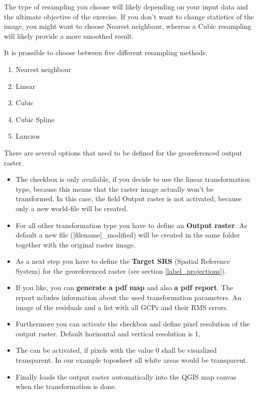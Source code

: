 The type of resampling you choose will likely depending on your input data
and the ultimate objective of the exercise. If you don't want to change
statistics of the image, you might want to choose Nearest neighbour,
whereas a Cubic resampling will likely provide a more smoothed result.

It is prossible to choose between five different resampling methods.

\begin{enumerate}
\item Nearest neighbour
\item Linear
\item Cubic
\item Cubic Spline
\item Lanczos
\end{enumerate}


There are several options that need to be defined for the georeferenced output 
raster. 

\begin{itemize}[label=--]
\item The checkbox  is only available, if 
you decide to use the linear transformation type, because this means that 
the raster image actually won't be transformed. In this case, the field 
Output raster is not activated, because only a new world-file will be 
created.
\item For all other transformation type you have to define an \textbf{Output 
raster}. As default a new file ([filename]\_modified) will be created in 
the same folder together with the original raster image.   
\item As a next step you have to define the \textbf{Target SRS} 
(Spatial Reference System) for the georeferenced raster 
(see section \ref{label_projections}). 
\item If you like, you can \textbf{generate a pdf map} and also \textbf{a 
pdf report}. The report ncludes information about the used transformation 
parameters. An image of the residuals and a list with all GCPs and their 
RMS errors.
\item Furthermore you can activate the  
checkbox and define pixel resolution of the output raster. Default horizontal 
and vertical resolution is 1,      
\item The  can be activated, if 
pixels with the value 0 shall be visualized transparent. In our example 
toposheet all white areas would be transparent.
\item Finally  loads the output raster 
automatically into the QGIS map canvas when the transformation is done.
\end{itemize}

